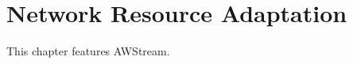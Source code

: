 \chapter{Network Resource Adaptation}
\label{cha:netw-reso-adapt}

This chapter features AWStream.










